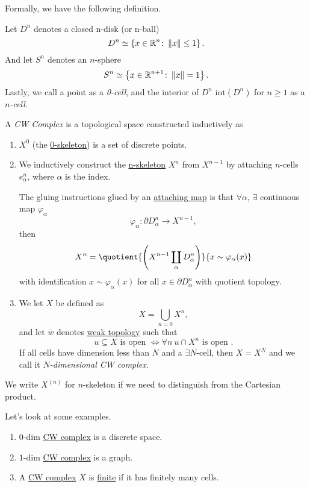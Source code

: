 \hr

Formally, we have the following definition.
\begin{notation}
	Let \(D^n\) denotes a closed n-disk (or n-ball)
	\[
		D^n\simeq \left\{x\in\mathbb{\MakeUppercase{R}} ^n\colon \left\lVert x\right\rVert \leq 1\right\}.
	\]
	And let \(S^n\) denotes an \(n\)-sphere
	\[
		S^n\simeq \left\{x\in \mathbb{\MakeUppercase{R}}^{n+1}\colon \left\lVert x\right\rVert = 1\right\}.
	\]
	Lastly, we call a point as a \emph{0-cell}, and the interior of \(D^n\) \(\mathrm{int}(D^n)\) for \(n\geq 1\) as a \emph{\(n\)-cell}.
\end{notation}
\begin{definition}[CW Complex]\label{def:CW-Complex}
	A \emph{CW Complex} is a topological space constructed inductively as
	\begin{enumerate}
		\item \(X^0\) (the \underline{0-skeleton}) is a set of discrete points.
		\item We inductively construct the \underline{n-skeleton} \(X^n\) from \(X^{n-1}\) by attaching \(n\)-cells \(e^n_{\alpha}\), where
		      \(\alpha\) is the index.
		      \par The gluing instructions glued by an \underline{attaching map} is that \(\forall \alpha\), \(\exists \) continuous map \(\varphi_{\alpha}\)
		      \[
			      \varphi_{\alpha}\colon \partial D^n_{\alpha}\to X^{n-1},
		      \]
		      then
		      \[
			      X^n = \quotient{\left(X^{n-1}\coprod\limits_{\alpha}D^n_\alpha\right)}{x\sim \varphi_{\alpha}(x)}
		      \]
		      with identification \(x\sim \varphi_{\alpha}(x)\) for all \(x\in \partial D^n_{\alpha}\) with quotient topology.
		\item We let \(X\) be defined as
		      \[
			      X = \bigcup\limits_{n=0} X^n,
		      \]
		      and let \(\overline{w} \) denotes \underline{weak topology} such that
		      \[
			      u\subseteq X \text{ is open }\iff \forall n\ u\cap X^n \text{ is open }.
		      \]
		      If all cells have dimension less than \(N\) and a \(\exists N\)-cell, then \(X = X^N\) and we call it \emph{\(N\)-dimensional CW complex}.
	\end{enumerate}
\end{definition}
\begin{remark}
	We write \(X^{(n)}\) for \(n\)-skeleton if we need to distinguish from the Cartesian product.
\end{remark}

\begin{eg}
	Let's look at some examples.
	\begin{enumerate}
		\item \(0\)-dim \hyperref[def:CW-Complex]{CW complex} is a discrete space.
		\item \(1\)-dim \hyperref[def:CW-Complex]{CW complex} is a graph.
		\item A \hyperref[def:CW-Complex]{CW complex} \(X\) is \underline{finite} if it has finitely many cells.
	\end{enumerate}
\end{eg}

